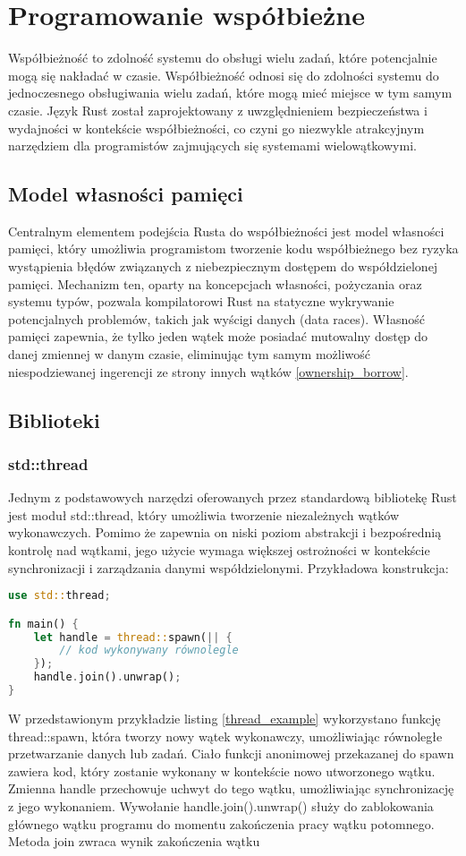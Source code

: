\section{Programowanie współbieżne}
Współbieżność to zdolność systemu do obsługi wielu zadań, które potencjalnie mogą się nakładać w czasie. Współbieżność odnosi się do zdolności systemu do jednoczesnego obsługiwania wielu zadań, które mogą mieć miejsce w tym samym czasie. Język Rust został zaprojektowany z uwzględnieniem bezpieczeństwa i wydajności w kontekście współbieżności, co czyni go niezwykle atrakcyjnym narzędziem dla programistów zajmujących się systemami wielowątkowymi.

\subsection{Model własności pamięci}
Centralnym elementem podejścia Rusta do współbieżności jest model własności pamięci, który umożliwia programistom tworzenie kodu współbieżnego bez ryzyka wystąpienia błędów związanych z niebezpiecznym dostępem do współdzielonej pamięci. Mechanizm ten, oparty na koncepcjach własności, pożyczania oraz systemu typów, pozwala kompilatorowi Rust na statyczne wykrywanie potencjalnych problemów, takich jak wyścigi danych (data races). Własność pamięci zapewnia, że tylko jeden wątek może posiadać mutowalny dostęp do danej zmiennej w danym czasie, eliminując tym samym możliwość niespodziewanej ingerencji ze strony innych wątków \ref{ownership_borrow}.

\subsection{Biblioteki}
\subsubsection{std::thread}
Jednym z podstawowych narzędzi oferowanych przez standardową bibliotekę Rust jest moduł std::thread, który umożliwia tworzenie niezależnych wątków wykonawczych. Pomimo że zapewnia on niski poziom abstrakcji i bezpośrednią kontrolę nad wątkami, jego użycie wymaga większej ostrożności w kontekście synchronizacji i zarządzania danymi współdzielonymi.
Przykładowa konstrukcja:
\begin{lstlisting}[language=Rust, caption=Przykład tworzenia wątku, label=thread_example]
use std::thread;

fn main() {
    let handle = thread::spawn(|| {
        // kod wykonywany równolegle
    });
    handle.join().unwrap();
}
\end{lstlisting}
W przedstawionym przykładzie listing \ref{thread_example} wykorzystano funkcję thread::spawn, która tworzy nowy wątek wykonawczy, umożliwiając równoległe przetwarzanie danych lub zadań. Ciało funkcji anonimowej przekazanej do spawn zawiera kod, który zostanie wykonany w kontekście nowo utworzonego wątku. Zmienna handle przechowuje uchwyt do tego wątku, umożliwiając synchronizację z jego wykonaniem.
Wywołanie handle.join().unwrap() służy do zablokowania głównego wątku programu do momentu zakończenia pracy wątku potomnego. Metoda join zwraca wynik zakończenia wątku
